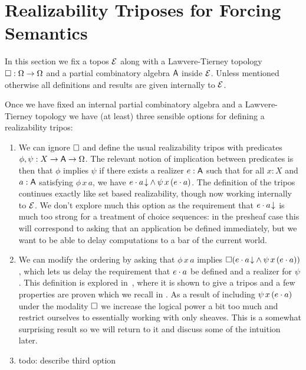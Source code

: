 \documentclass[11pt]{article}
\begin{document}
\newpage

\section{Realizability Triposes for Forcing Semantics}

In this section we fix a topos \(\mathcal{E}\) along with a Lawvere-Tierney
topology \(\Box : \Omega \to \Omega\) and a partial combinatory
algebra \(\mathsf{A}\) inside \(\mathcal{E}\).
%
Unless mentioned otherwise all definitions and results are given
internally to \(\mathcal{E}\).

Once we have fixed an internal partial combinatory algebra and a Lawvere-Tierney
topology we have (at least) three sensible options for defining a realizability
tripos:
\begin{enumerate}
  \item We can ignore \(\Box\) and define the usual realizability tripos
    with predicates \(\phi,\psi:{{X}\to{{{\ensuremath{\mathsf{A}}}\to{\Omega}}}}\).
    The relevant notion of implication between predicates is then that \(\phi\)
    implies \(\psi\) if there exists a realizer \(e:\mathsf{A}\) such that for all
    \(x:X\) and \(a:\mathsf{A}\) satisfying \(\phi\,x\,a\), we have
    \({{{{e}\cdot{a}}\!\downarrow}}\land{\psi\,x\,({e}\cdot{a})}\).
    The definition of the tripos continues exactly like set based realizability,
    though now working internally to \(\mathcal{E}\).
    We don't explore much this option as the requirement that
    \({{{e}\cdot{a}}\!\downarrow}\) is much too strong for a treatment of choice
    sequences: in the presheaf case this will correspond to asking that an
    application be defined immediately, but we want to be able to delay
    computations to a bar of the current world.

  \item We can modify the ordering by asking that \(\phi\,x\,a\) implies
    \(\Box{({{{{e}\cdot{a}}\!\downarrow}}\land{\psi\,x\,({e}\cdot{a})})}\), which lets
    us delay the requirement that \({e}\cdot{a}\) be defined and a realizer for
    \(\psi\).
    This definition is explored in~\cite{vanoostenExercisesRealizability2018},
    where it is shown to give a tripos and a few properties are proven which we
    recall in .
    As a result of including \(\psi\,x\,({e}\cdot{a})\) under the modality
    \(\Box\) we increase the logical power a bit too much and restrict
    ourselves to essentially working with only sheaves.
    This is a somewhat surprising result so we will return to it and discuss
    some of the intuition later.

  \item {\color{red} todo: describe third option}


\end{enumerate}
\end{document}
